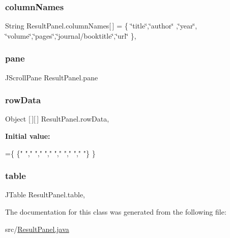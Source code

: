 \subsubsection{\texorpdfstring{column\+Names}{columnNames}}
{\footnotesize\ttfamily String Result\+Panel.\+column\+Names\mbox{[}$\,$\mbox{]} = \{ \char`\"{}title\char`\"{},\char`\"{}author\char`\"{} ,\char`\"{}year\char`\"{}, \char`\"{}volume\char`\"{},\char`\"{}pages\char`\"{},\char`\"{}journal/booktitle\char`\"{},\char`\"{}url\char`\"{} \}\hspace{0.3cm}{\ttfamily [static]}, {\ttfamily [private]}}

\hypertarget{class_result_panel_aa9b24b254e779baf6679dbbc6af4fe38}{}\label{class_result_panel_aa9b24b254e779baf6679dbbc6af4fe38} 
\subsubsection{\texorpdfstring{pane}{pane}}
{\footnotesize\ttfamily J\+Scroll\+Pane Result\+Panel.\+pane\hspace{0.3cm}{\ttfamily [private]}}

\hypertarget{class_result_panel_ac748be7e13e72b23ee1b7486c71e4400}{}\label{class_result_panel_ac748be7e13e72b23ee1b7486c71e4400} 
\subsubsection{\texorpdfstring{row\+Data}{rowData}}
{\footnotesize\ttfamily Object \mbox{[}$\,$\mbox{]}\mbox{[}$\,$\mbox{]} Result\+Panel.\+row\+Data\hspace{0.3cm}{\ttfamily [static]}, {\ttfamily [private]}}

{\bfseries Initial value\+:}
\begin{DoxyCode}
=\{
            \{\textcolor{stringliteral}{" "},\textcolor{stringliteral}{" "},\textcolor{stringliteral}{" "},\textcolor{stringliteral}{" "},\textcolor{stringliteral}{" "},\textcolor{stringliteral}{" "},\textcolor{stringliteral}{" "}\}
    \}
\end{DoxyCode}
\hypertarget{class_result_panel_a7efcc61cd33b439bb4a4ce365a05fcd9}{}\label{class_result_panel_a7efcc61cd33b439bb4a4ce365a05fcd9} 
\subsubsection{\texorpdfstring{table}{table}}
{\footnotesize\ttfamily J\+Table Result\+Panel.\+table\hspace{0.3cm}{\ttfamily [static]}, {\ttfamily [private]}}



The documentation for this class was generated from the following file\+:\begin{DoxyCompactItemize}
\item 
src/\hyperlink{_result_panel_8java}{Result\+Panel.\+java}\end{DoxyCompactItemize}
